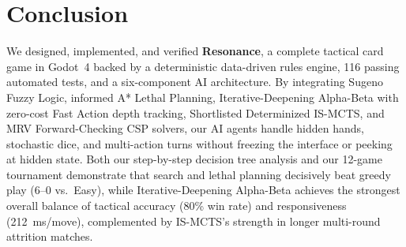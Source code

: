\documentclass[11pt,a4paper]{article}
\begin{document}
\section{Conclusion}

We designed, implemented, and verified \textbf{Resonance}, a complete tactical card game in Godot~4 backed by a deterministic data-driven rules engine, 116 passing automated tests, and a six-component AI architecture. By integrating Sugeno Fuzzy Logic, informed A* Lethal Planning, Iterative-Deepening Alpha-Beta with zero-cost Fast Action depth tracking, Shortlisted Determinized IS-MCTS, and MRV Forward-Checking CSP solvers, our AI agents handle hidden hands, stochastic dice, and multi-action turns without freezing the interface or peeking at hidden state. Both our step-by-step decision tree analysis and our 12-game tournament demonstrate that search and lethal planning decisively beat greedy play (6--0 vs.\ Easy), while Iterative-Deepening Alpha-Beta achieves the strongest overall balance of tactical accuracy (80\% win rate) and responsiveness (212~ms/move), complemented by IS-MCTS's strength in longer multi-round attrition matches.
\end{document}
